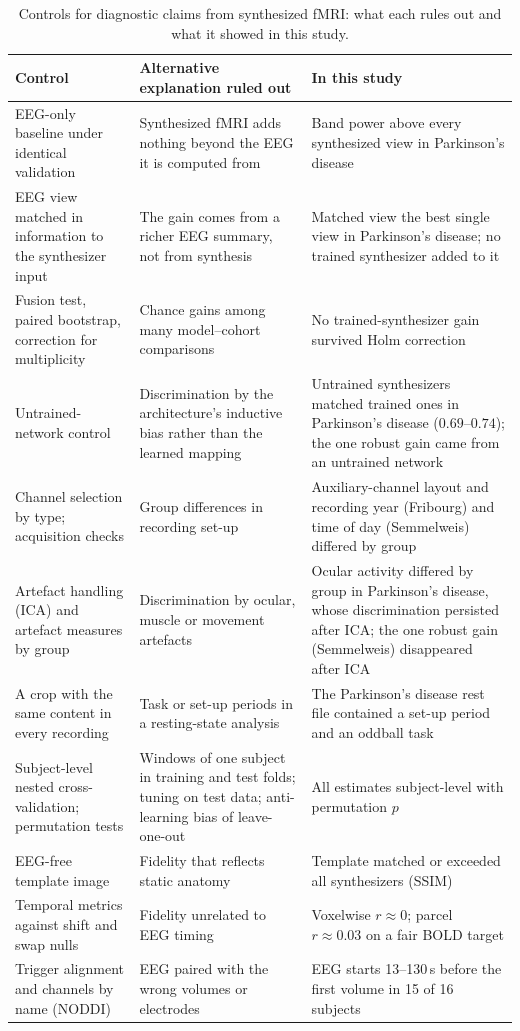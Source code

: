 \documentclass[pdflatex,referee,sn-basic]{sn-jnl}%
\begin{document}
\begin{table}[!htbp]
    \centering
    \caption{Controls for diagnostic claims from synthesized fMRI: what each rules out and what it showed in this study.}
    \label{tab:checklist}
    \footnotesize
    \begin{tabular}{@{}>{\raggedright\arraybackslash}p{3.4cm}>{\raggedright\arraybackslash}p{4.0cm}>{\raggedright\arraybackslash}p{4.4cm}@{}}
        \hline
        Control & Alternative explanation ruled out & In this study \\
        \hline
        EEG-only baseline under identical validation & Synthesized fMRI adds nothing beyond the EEG it is computed from & Band power above every synthesized view in Parkinson's disease \\
        EEG view matched in information to the synthesizer input & The gain comes from a richer EEG summary, not from synthesis & Matched view the best single view in Parkinson's disease; no trained synthesizer added to it \\
        Fusion test, paired bootstrap, correction for multiplicity & Chance gains among many model--cohort comparisons & No trained-synthesizer gain survived Holm correction \\
        Untrained-network control & Discrimination by the architecture's inductive bias rather than the learned mapping & Untrained synthesizers matched trained ones in Parkinson's disease ($0.69$--$0.74$); the one robust gain came from an untrained network \\
        Channel selection by type; acquisition checks & Group differences in recording set-up & Auxiliary-channel layout and recording year (Fribourg) and time of day (Semmelweis) differed by group \\
        Artefact handling (ICA) and artefact measures by group & Discrimination by ocular, muscle or movement artefacts & Ocular activity differed by group in Parkinson's disease, whose discrimination persisted after ICA; the one robust gain (Semmelweis) disappeared after ICA \\
        A crop with the same content in every recording & Task or set-up periods in a resting-state analysis & The Parkinson's disease rest file contained a set-up period and an oddball task \\
        Subject-level nested cross-validation; permutation tests & Windows of one subject in training and test folds; tuning on test data; anti-learning bias of leave-one-out & All estimates subject-level with permutation $p$ \\
        EEG-free template image & Fidelity that reflects static anatomy & Template matched or exceeded all synthesizers (SSIM) \\
        Temporal metrics against shift and swap nulls & Fidelity unrelated to EEG timing & Voxelwise $r\approx0$; parcel $r\approx0.03$ on a fair BOLD target \\
        Trigger alignment and channels by name (NODDI) & EEG paired with the wrong volumes or electrodes & EEG starts 13--130\,s before the first volume in 15 of 16 subjects \\
        \hline
    \end{tabular}
\end{table}
\end{document}
